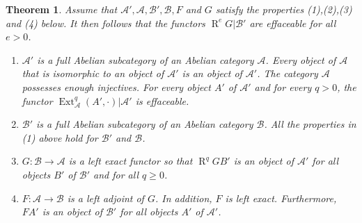 \documentclass[10pt,twoside]{article}
\newtheorem{thm}{Theorem}[section]
\newcommand{\Ext}{{\operatorname{Ext}}}
\newcommand{\derived}{{\operatorname{R}}}
\begin{document}
\begin{thm}Assume that 
$\mathcal{A'},\mathcal{A},
\mathcal{B'}, \mathcal{B}, F$ and $G$  
satisfy the properties (1),(2),(3) and (4) below.
It then follows that the functors 
$\derived^eG|\mathcal{B'}$ are effaceable 
for all $e>0$. 
\begin {enumerate}
\item[{\rm (1)}] $\mathcal{A'}$ is a full Abelian subcategory 
of an Abelian category $\mathcal{A}$. Every object of 
 $\mathcal{A}$ that is isomorphic to an object of 
$\mathcal{A'}$ is an object of $\mathcal{A'}$. The
category $\mathcal{A}$ possesses enough injectives.
For every object $A'$ of $\mathcal{A'}$ and for every
$q>0$, the functor $\Ext^q_{\mathcal{A}}(A', \cdot)|\mathcal{A'}$ 
is effaceable. 
\item [{\rm (2)}] $\mathcal{B'}$ is a full Abelian subcategory 
of an Abelian category $\mathcal{B}$. All the properties in
(1) above hold for $\mathcal{B'}$ and $\mathcal{B}$.
\item [{\rm (3)}] $G: \mathcal{B}\to \mathcal{A} $ is a left
exact functor so that $\derived^qGB'$ is an object of 
$\mathcal{A'}$ for all objects $B'$ of $\mathcal{B'}$
and for all $q \geq 0$. 
\item[{\rm (4)}] $F: \mathcal{A}\to \mathcal{B} $ is a left 
adjoint of $G$. In addition, $F$ is left exact. Furthermore, 
 $FA'$ is an object of $\mathcal{B'} $ for all objects $A'$ of $\mathcal{A'}$. 
\end{enumerate}
\end{thm}
\end{document}
